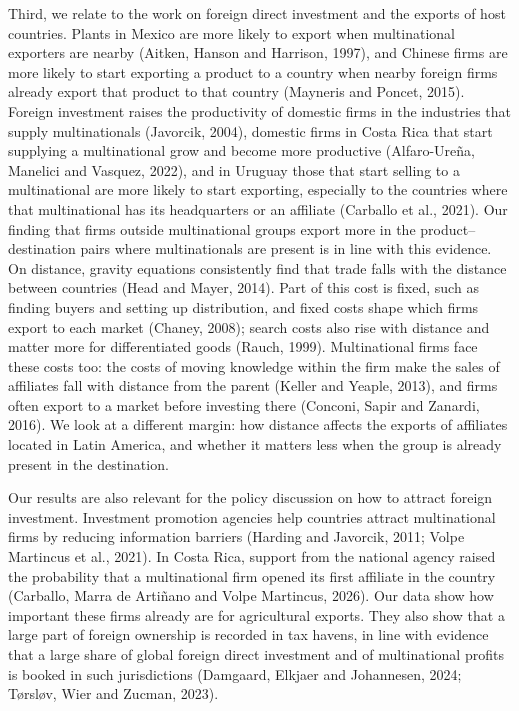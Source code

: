 \documentclass[11pt,a4paper]{article}
\begin{document}
Third, we relate to the work on foreign direct investment and the exports of host countries. Plants
in Mexico are more likely to export when multinational exporters are nearby (Aitken, Hanson and
Harrison, 1997), and Chinese firms are more likely to start exporting a product to a country when
nearby foreign firms already export that product to that country (Mayneris and Poncet, 2015).
Foreign investment raises the productivity of domestic firms in the industries that supply
multinationals (Javorcik, 2004), domestic firms in Costa Rica that start supplying a multinational
grow and become more productive (Alfaro-Ure\~na, Manelici and Vasquez, 2022), and in Uruguay those
that start selling to a multinational are more likely to start exporting, especially to the
countries where that multinational has its headquarters or an affiliate (Carballo et al., 2021).
Our finding that firms outside multinational groups export more in the product--destination pairs
where multinationals are present is in line with this evidence. On distance, gravity equations
consistently find that trade falls with the distance between countries (Head and Mayer, 2014). Part of
this cost is fixed, such as finding buyers and setting up distribution, and fixed costs shape which
firms export to each market (Chaney, 2008); search costs also rise with distance and matter more
for differentiated goods (Rauch, 1999). Multinational firms face these costs too: the costs of
moving knowledge within the firm make the sales of affiliates fall with distance from the parent
(Keller and Yeaple, 2013), and firms often export to a market before investing there (Conconi,
Sapir and Zanardi, 2016). We look at a different margin: how distance affects the exports of
affiliates located in Latin America, and whether it matters less when the group is already present
in the destination.

Our results are also relevant for the policy discussion on how to attract foreign investment.
Investment promotion agencies help countries attract multinational firms by reducing information
barriers (Harding and Javorcik, 2011; Volpe Martincus et al., 2021). In Costa Rica, support from the
national agency raised the probability that a multinational firm opened its first affiliate in the
country (Carballo, Marra de Arti\~nano and Volpe Martincus, 2026). Our data show how important
these firms already are for agricultural exports. They also show that a large part of foreign
ownership is recorded in tax havens, in line with evidence that a large share of global foreign
direct investment and of multinational profits is booked in such jurisdictions (Damgaard, Elkjaer
and Johannesen, 2024; T{\o}rsl{\o}v, Wier and Zucman, 2023).
\end{document}
